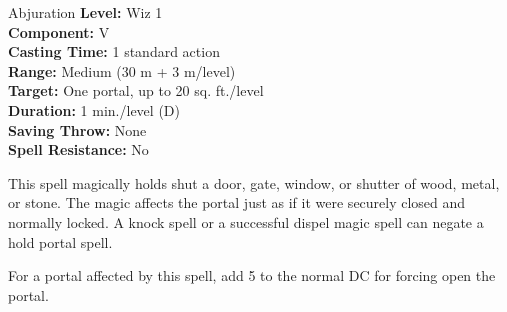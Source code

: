 {Abjuration}
{
	\textbf{Level:}
	Wiz 1\\
	\textbf{Component:}
	V\\
	\textbf{Casting Time:}
	1 standard action\\
	\textbf{Range:}
	Medium (30 m + 3 m/level)\\
	\textbf{Target:}
	One portal, up to 20 sq. ft./level\\
	\textbf{Duration:}
	1 min./level (D)\\
	\textbf{Saving Throw:}
	None\\
	\textbf{Spell Resistance:}
	No\\
}
{
	This spell magically holds shut a door, gate, window, or shutter of wood, metal, or stone. The magic affects the portal just as if it were securely closed and normally locked. A knock spell or a successful dispel magic spell can negate a hold portal spell.

	For a portal affected by this spell, add 5 to the normal DC for forcing open the portal.

}
